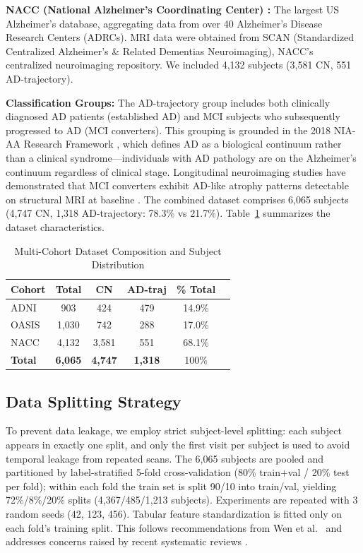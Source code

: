 \documentclass[conference]{IEEEtran}
\begin{document}
\textbf{NACC (National Alzheimer's Coordinating Center) \cite{nacc2007}:} The largest US Alzheimer's database, aggregating data from over 40 Alzheimer's Disease Research Centers (ADRCs). MRI data were obtained from SCAN (Standardized Centralized Alzheimer's \& Related Dementias Neuroimaging), NACC's centralized neuroimaging repository. We included 4,132 subjects (3,581 CN, 551 AD-trajectory).

\textbf{Classification Groups:} The AD-trajectory group includes both clinically diagnosed AD patients (established AD) and MCI subjects who subsequently progressed to AD (MCI converters). This grouping is grounded in the 2018 NIA-AA Research Framework \cite{jack2018}, which defines AD as a biological continuum rather than a clinical syndrome---individuals with AD pathology are on the Alzheimer's continuum regardless of clinical stage. Longitudinal neuroimaging studies have demonstrated that MCI converters exhibit AD-like atrophy patterns detectable on structural MRI at baseline \cite{jack2000,misra2009}. The combined dataset comprises 6,065 subjects (4,747 CN, 1,318 AD-trajectory: 78.3\% vs 21.7\%). Table~\ref{tab:dataset} summarizes the dataset characteristics.


\begin{table}[htbp]
\caption{Multi-Cohort Dataset Composition and Subject Distribution}
\begin{center}
\begin{tabular}{lccccc}
\toprule
\textbf{Cohort} & \textbf{Total} & \textbf{CN} & \textbf{AD-traj} & \textbf{\% Total} \\
\midrule
ADNI & 903 & 424 & 479 & 14.9\% \\
OASIS & 1,030 & 742 & 288 & 17.0\% \\
NACC & 4,132 & 3,581 & 551 & 68.1\% \\
\midrule
\textbf{Total} & \textbf{6,065} & \textbf{4,747} & \textbf{1,318} & 100\% \\
\bottomrule
\end{tabular}
\label{tab:dataset}
\end{center}
\end{table}

\subsection{Data Splitting Strategy}

To prevent data leakage, we employ strict subject-level splitting: each subject appears in exactly one split, and only the first visit per subject is used to avoid temporal leakage from repeated scans. The 6{,}065 subjects are pooled and partitioned by label-stratified 5-fold cross-validation (80\% train+val / 20\% test per fold); within each fold the train set is split 90/10 into train/val, yielding 72\%/8\%/20\% splits (4{,}367/485/1{,}213 subjects). Experiments are repeated with 3 random seeds (42, 123, 456). Tabular feature standardization is fitted only on each fold's training split. This follows recommendations from Wen et al.\ \cite{wen2020} and addresses concerns raised by recent systematic reviews \cite{yagis2021}.
\end{document}
